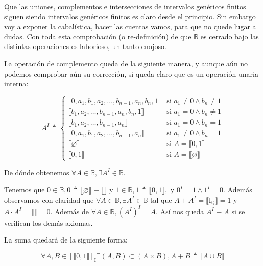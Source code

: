   Que las uniones, complementos e intersecciones de intervalos genéricos
  finitos siguen siendo intervalos genéricos finitos es claro desde el
  principio. Sin embargo voy a exponer la cabalística, hacer las cuentas
  vamos, para que no quede lugar a dudas. Con toda esta comprobación (o
  re-definición) de que $\mathbb{B}$ es cerrado bajo las distintas operaciones
  es laborioso, un tanto enojoso.

  La operación de complemento queda de la siguiente manera, y aunque aún
  no podemos comprobar aún su corrección, si queda claro que es un
  operación unaria interna:

  \[
A^{I} \triangleq \begin{cases}
  \llbracket 0, a_1, b_1, a_2, \ldots, b_{n-1}, a_n, b_n, 1 \rrbracket & \text{si } a_1 \neq 0 \land b_n \neq 1 \\
  \llbracket b_1, a_2, \ldots, b_{n-1}, a_n, b_n, 1 \rrbracket & \text{si } a_1 = 0 \land b_n \neq 1 \\
  \llbracket b_1, a_2, \ldots, b_{n-1}, a_n \rrbracket & \text{si } a_1 = 0 \land b_n = 1 \\
  \llbracket 0, a_1, b_1, a_2, \ldots, b_{n-1}, a_n \rrbracket & \text{si } a_1 \neq 0 \land b_n = 1 \\
  \llbracket \varnothing \rrbracket & \text{si } A = \llbracket 0, 1 \rrbracket \\
  \llbracket 0, 1 \rrbracket & \text{si } A = \llbracket \varnothing \rrbracket
\end{cases}
\]

De dónde obtenemos $\forall A \in \mathbb{B}, \exists A^{I} \in \mathbb{B}.$

Tenemos que $0 \in \mathbb{B}, 0 \triangleq \llbracket \varnothing \rrbracket \equiv \llbracket \rrbracket$ y $1 \in \mathbb{B}, 1 \triangleq \llbracket 0,1 \rrbracket,$ y $0^{I} = 1 \land 1^{I} = 0.$ Además observamos con claridad que $\forall A \in \mathbb{B}, \exists A^{I} \in \mathbb{B}$ tal que $A + A^{I} = \llbracket \mathbf{\mathrm{I}}_{\mathbb{Q}} \rrbracket = 1$ y $A \cdot A^{I} = \llbracket \rrbracket = 0.$ Además de $\forall A \in \mathbb{B}, (A^{I})^{I} = A.$ Así nos queda $A^{I} \equiv \overline{A}$ si se verifican los demás axiomas.

La suma quedará de la siguiente forma:

\[ \forall A, B \in \left\lbrack \llbracket 0,1 \rrbracket \right\rbrack_{\mathbf{\mathrm{I}}} \exists (A,B) \subset (A \times B), A + B \triangleq \llbracket A \cup B \rrbracket \]

